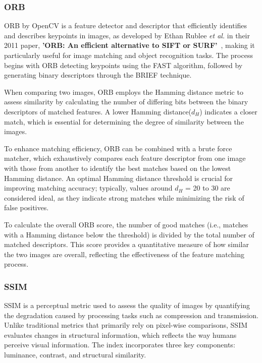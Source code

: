 \documentclass[12pt,DIV14,BCOR12mm,a4paper,footinclude=false,headinclude,parskip=half-,twoside,openright,cleardoublepage=empty,toc=index,bibliography=totoc,listof=totoc]{scrreprt}
\numberwithin{equation}{chapter}
\begin{document}
\subsubsection{ORB}
ORB by OpenCV is a feature detector and descriptor that efficiently identifies and describes keypoints in images, as developed by Ethan Rublee \textit{et al.} in their 2011 paper, \textbf{'ORB: An efficient alternative to SIFT or SURF'}~\cite{ORB}, making it particularly useful for image matching and object recognition tasks. The process begins with ORB detecting keypoints using the FAST algorithm, followed by generating binary descriptors through the BRIEF technique.

When comparing two images, ORB employs the Hamming distance metric to assess similarity by calculating the number of differing bits between the binary descriptors of matched features. A lower Hamming distance(\(d_H\)) indicates a closer match, which is essential for determining the degree of similarity between the images.

To enhance matching efficiency, ORB can be combined with a brute force matcher, which exhaustively compares each feature descriptor from one image with those from another to identify the best matches based on the lowest Hamming distance. An optimal Hamming distance threshold is crucial for improving matching accuracy; typically, values around \(d_H\) = 20 to 30 are considered ideal, as they indicate strong matches while minimizing the risk of false positives.

To calculate the overall ORB score, the number of good matches (i.e., matches with a Hamming distance below the threshold) is divided by the total number of matched descriptors. This score provides a quantitative measure of how similar the two images are overall, reflecting the effectiveness of the feature matching process.

\subsubsection{SSIM}
SSIM is a perceptual metric used to assess the quality of images by quantifying the degradation caused by processing tasks such as compression and transmission. Unlike traditional metrics that primarily rely on pixel-wise comparisons, SSIM evaluates changes in structural information, which reflects the way humans perceive visual information. The index incorporates three key components: luminance, contrast, and structural similarity.
\end{document}
